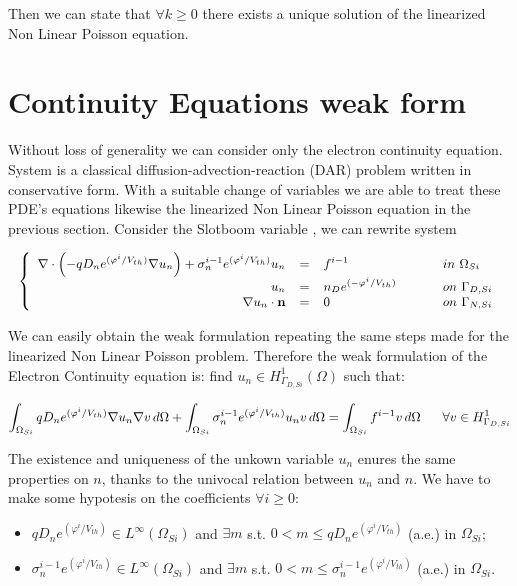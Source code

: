 Then we can state that $\forall k \geq 0$ there exists a unique solution of the linearized Non Linear Poisson equation.

\section{Continuity Equations weak form}

Without loss of generality we can consider only the electron continuity equation. System  is a classical diffusion-advection-reaction (DAR) problem written in conservative form. With a suitable change of variables we are able to treat these PDE's equations likewise the linearized Non Linear Poisson equation in the previous section. Consider the Slotboom variable , we can rewrite system 

\begin{equation}
\small
\left\{
\begin{array}{rcll}
 \nabla \cdot \left( - q D_n e^{(\varphi^{i}/V_{th})}\nabla u_n \right) + \sigma_n^{i-1} e^{(\varphi^{i}/V_{th})} u_n& = & f^{i-1}  & \psp{15} in \psp{2} \Omega_{Si} \\
u_n & = &  n_D e^{(-\varphi^{i}/V_{th})} & \psp{15} on \psp{2} \Gamma_{D,Si} \\
\nabla u_n \cdot \vect{n} & = & 0 & \psp{15} on \psp{2} \Gamma_{N,Si}
\end{array}
\right.
\end{equation}

We can easily obtain the weak formulation repeating the same steps made for the linearized Non Linear Poisson problem. Therefore the weak formulation of the Electron Continuity equation is: find $u_n \in H^1_{\Gamma_{D,Si}}(\Omega)$ such that:

\begin{equation}
\small
\label{eq: LEC weakformulation}
\int_{\Omega_{Si}}  q D_n e^{(\varphi^{i}/V_{th})} \nabla u_n \nabla v \, d\Omega + \int_{\Omega_{Si}} \sigma_n^{i-1} e^{(\varphi^{i}/V_{th})} u_n v \, d\Omega = \int_{\Omega_{Si}} f^{i-1}v \, d\Omega \psp{10} \forall v \in H^1_{\Gamma_{D,Si}}
\end{equation}


The existence and uniqueness of the unkown variable $u_n$ enures the same properties on $n$, thanks to the univocal relation between $u_n$ and $n$.
We have to make some hypotesis on the coefficients $\forall i\geq 0$:
\begin{itemize}
\item $q D_n e^{(\varphi^{i}/V_{th})} \in L^{\infty}(\Omega_{Si})$ and $\exists m$ s.t. $0 < m \leq q D_n e^{(\varphi^{i}/V_{th})}$ (a.e.) in $\Omega_{Si}$;
\item  $\sigma_n^{i-1} e^{(\varphi^{i}/V_{th})} \in L^{\infty}(\Omega_{Si})$ and $\exists m$ s.t. $0 < m \leq \sigma_n^{i-1} e^{(\varphi^{i}/V_{th})}$ (a.e.) in $\Omega_{Si}$.
\end{itemize}

